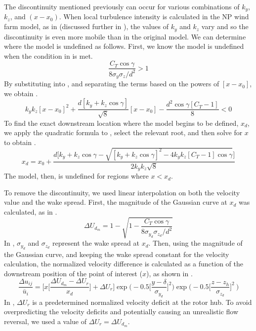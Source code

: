 \documentclass[conf]{new-aiaa}
\begin{document}
The discontinuity mentioned previously can occur for various combinations of $k_y$, $k_z$, and $(x-x_0)$. When local turbulence intensity is calculated in the NP wind farm model, as in \cite{niayifar2016} (discussed further in ), the values of $k_y$ and $k_z$ vary and so the discontinuity is even more mobile than in the original model. We can determine where the model is undefined as follows. First, we know the model is undefined when the condition in  is met.
%
\begin{equation}\label{eq:gt1}
	\frac{C_T \cos{\gamma}}{8\sigma_y \sigma_z/d^2} > 1
\end{equation}
%
By substituting  into , and separating the terms based on the powers of $[x-x_0]$, we obtain .
%
\begin{equation}\label{eq:xd1}
	k_y k_z [x-x_0]^2 + \frac{d[k_y+k_z \cos{\gamma}]}{\sqrt{8}}[x-x_0] - \frac{d^2 \cos{\gamma}[C_T -1]}{8} < 0
\end{equation}
%
To find the exact downstream location where the model begins to be defined, $x_d$, we apply the quadratic formula to , select the relevant root, and then solve for $x$ to obtain .
%
\begin{equation}\label{eq:xd}
	x_d = x_0 + \frac{d\Bigg[k_y+k_z\cos{\gamma} - \sqrt{[k_y+k_z\cos{\gamma}]^2-4k_y k_z[C_T-1]\cos{\gamma}}\Bigg]}{2k_y k_z\sqrt{8}}
\end{equation}
%
The model, then, is undefined for regions where $x<x_d$. 

To remove the discontinuity, we used linear interpolation on both the velocity value and the wake spread. First, the magnitude of the Gaussian curve at $x_d$ was calculated, as in .
%
\begin{equation}\label{eq:gauss-mag}
	\Delta U_{d_m} = 1 - \sqrt{1 - \frac{C_T \cos{\gamma}}{8 \sigma_{y_d}  \sigma_{z_d}/d^2}}
\end{equation}
%
In , $\sigma_{y_d}$ and $\sigma_{z_d}$ represent the wake spread at $x_d$. Then, using the magnitude of the Gaussian curve, and keeping the wake spread constant for the velocity calculation, the normalized velocity difference is calculated as a function of the downstream position of the point of interest ($x$), as shown in .
\begin{equation}\label{eq:bplinear}
	\frac{\Delta u_{ij}}{\bar{u}_{i}} = \bigg[x\bigg[\frac{\Delta U_{d_m} - \Delta U_r}{x_d}\bigg] + \Delta U_r\bigg]
        \exp{\bigg(-0.5\bigg[\frac{y-\delta}{ \sigma_{y_d}}\bigg]^2\bigg)}\exp{\bigg(-0.5\bigg[\frac{z-z_h}{ \sigma_{z_d}}\bigg]^2~\bigg)}
\end{equation}
%
In , $\Delta U_r$ is a predetermined normalized velocity deficit at the rotor hub. To avoid overpredicting the velocity deficits and potentially causing an unrealistic flow reversal,  we used a value of $\Delta U_r=\Delta U_{d_m}$. 
\end{document}
